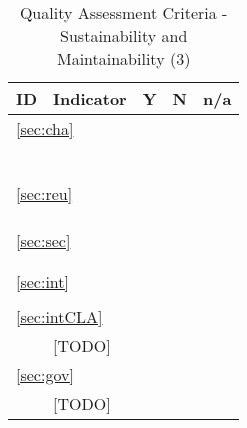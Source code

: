\documentclass[a4paper,11pt]{article}
\begin{document}
\begin{table}[hbt]
	\begin{tabular}
		{ p{} | 
			p{} |
			p{} |
			p{} |
			p{} }
        \hline
        \textbf{ID} & \textbf{Indicator} & \textbf{Y} & \textbf{N} & \textbf{n/a} \\
        \hline 
		\multicolumn{5}{l}{\ref{sec:cha}{ }\nameref{sec:cha}} \\
		\hline	
		\hyperref[id:ch1]{\chOneID} & \chOneText & & & \\
		\hyperref[id:ch2]{\chTwoID} & \chTwoText & & & \\
		\hyperref[id:ch3]{\chThreeID} & \chThreeText & & & \\
		\hyperref[id:ch4]{\chFourID} & \chFourText & & & \\
		\hyperref[id:ch5]{\chFiveID} & \chFiveText & & & \\
		\hyperref[id:ch6]{\chSixID} & \chSixText & & & \\
		\hline
        \multicolumn{5}{l}{\ref{sec:reu}{ }\nameref{sec:reu}} \\
		\hline	
		\hyperref[id:r1]{\rOneID} & \rOneText & & & \\
		\hyperref[id:r2]{\rTwoID} & \rTwoText & & & \\
		\hyperref[id:r3]{\rThreeID} & \rThreeText & & & \\
		\hline
		\multicolumn{5}{l}{\ref{sec:sec}{ }\nameref{sec:sec}} \\
		\hline	
		\hyperref[id:sc1]{\scOneID} & \scOneText & & & \\
		\hyperref[id:sc2]{\scTwoID} & \scTwoText & & & \\
		\hline
		\multicolumn{5}{l}{\ref{sec:int}{ }\nameref{sec:int}} \\
		\hline	
		\hyperref[id:ip1]{\ipOneID} & \ipOneText & & & \\
		\hline
		\multicolumn{5}{l}{\ref{sec:intCLA}{ }\nameref{sec:intCLA}} \\
		\hline	
		&  [TODO] & & & \\
		\hline
		\multicolumn{5}{l}{\ref{sec:gov}{ }\nameref{sec:gov}} \\
		\hline	
		& [TODO] & & & \\
		\hline
\end{tabular}
	\caption{Quality Assessment Criteria - Sustainability and Maintainability (3)}
	\label{tab:criteriaSustMaint3}
\end{table}
\end{document}
